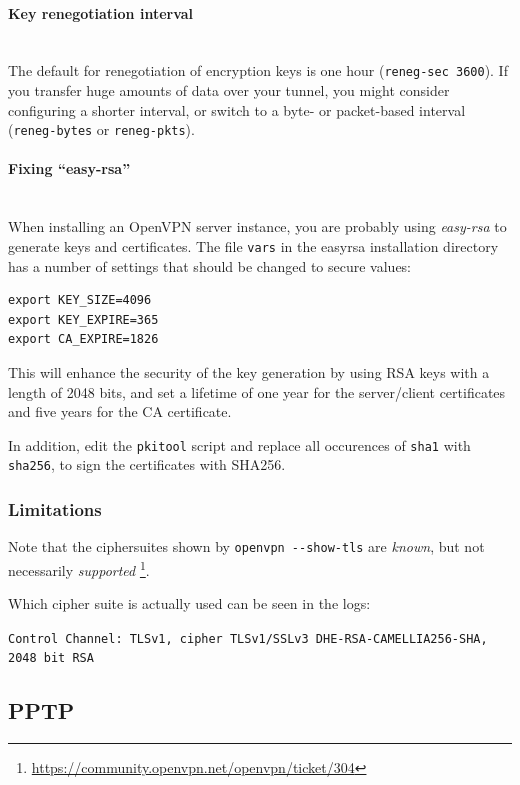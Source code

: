 \paragraph{Key renegotiation interval}\mbox{}\\
The default for renegotiation of encryption keys is one hour
(\verb|reneg-sec 3600|). If you
transfer huge amounts of data over your tunnel, you might consider
configuring a shorter interval, or switch to a byte- or packet-based
interval (\verb|reneg-bytes| or \verb|reneg-pkts|).

\paragraph{Fixing ``easy-rsa''}\mbox{}\\
When installing an OpenVPN server instance, you are probably using
{\it easy-rsa} to generate keys and certificates.
The file \verb|vars| in the easyrsa installation directory has a
number of settings that should be changed to secure values:

\begin{lstlisting}
export KEY_SIZE=4096
export KEY_EXPIRE=365
export CA_EXPIRE=1826
\end{lstlisting}

This will enhance the security of the key generation by using RSA keys
with a length of 2048 bits, and set a lifetime of one year for the
server/client certificates and five years for the CA certificate.

In addition, edit the \verb|pkitool| script and replace all occurences
of \verb|sha1| with \verb|sha256|, to sign the certificates with
SHA256.


\subsubsection{Limitations}
Note that the ciphersuites shown by \verb|openvpn --show-tls| are {\it
known}, but not necessarily {\it
supported} \footnote{\url{https://community.openvpn.net/openvpn/ticket/304}}.

Which cipher suite is actually used can be seen in the logs:

\verb|Control Channel: TLSv1, cipher TLSv1/SSLv3 DHE-RSA-CAMELLIA256-SHA, 2048 bit RSA|


\subsection{PPTP}

